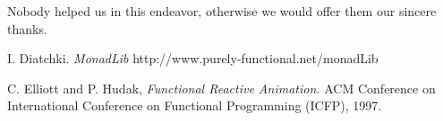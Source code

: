 \documentclass[preprint]{sigplanconf}
\begin{document}
\acks

Nobody helped us in this endeavor, otherwise we would offer them our sincere thanks. 





\begin{thebibliography}{}
\softraggedright

 
  I. Diatchki.
  \emph{MonadLib}
  http://www.purely-functional.net/monadLib

  C. Elliott and P. Hudak, 
  \emph{Functional Reactive Animation.}
  ACM Conference on International Conference on Functional Programming (ICFP), 1997.

   
\end{thebibliography}




\end{document}
